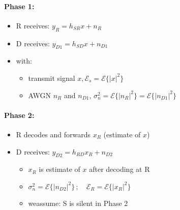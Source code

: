 \documentclass[a4paper, 10pt]{article}
\begin{document}
\paragraph{Phase 1:}
\begin{itemize}
	\item R receives: $ y_R = h_{SR}x + n_R $
	\item D receives: $ y_{D1} = h_{SD}x + n_{D1} $
	\item with: 
	\begin{itemize}
		\item transmit signal $x, \mathcal{E}_s = \mathcal{E}\{|x|^2\} $
		\item AWGN $n_R $ and $ n_{D1}$, $\sigma_n^2 = \mathcal{E}\{|n_R|^2\} = \mathcal{E}\{|n_{D1}|^2\} $
	\end{itemize}
\end{itemize}
\paragraph{Phase 2:}
\begin{itemize}
	\item R decodes and forwards $x_R$ (estimate of $x$)
	\item D receives: $ y_{D2} = h_{RD}x_R + n_{D2} $
	\begin{itemize}
		\item $x_R$ is estimate of $x $ after decoding at R
		\item $\sigma_n^2 = \mathcal{E}\{|n_{D2}|^2\}\,;\quad \mathcal{E}_R = \mathcal{E}\{|x_R|^2\} $
		\item weassume: S is silent in Phase 2		 
	\end{itemize}
\end{itemize}
\end{document}
